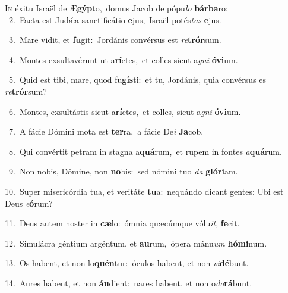 \lettrine{\initial\textcolor{\initialcolor}{I}}{n} éxitu Israël de Æ\-\textbf{gýp}\-to,~\star domus Jacob de pópu\textit{lo} \textbf{bár}\-\textbf{ba}ro:\\
{\numbfont\textcolor{\numbcolor}{~2.}}~Facta est Judǽa sanctificátio \textbf{e}\-jus,~\star Israël potés\textit{tas} \textbf{e}\-jus.\par
{\numbfont\textcolor{\numbcolor}{~3.}}~Mare vidit, et \textbf{fu}\-git:~\star Jordánis convérsus est \textit{re}\-\textbf{trór}sum.\par
{\numbfont\textcolor{\numbcolor}{~4.}}~Montes exsultavérunt ut a\-\textbf{rí}\-etes,~\star et colles sicut a\textit{gni} \textbf{ó}\-\textbf{vi}um.\par
{\numbfont\textcolor{\numbcolor}{~5.}}~Quid est tibi, mare, quod fu\-\textbf{gís}\-ti:~\star et tu, Jordánis, quia convérsus es \textit{re}\-\textbf{trór}sum?\par
{\numbfont\textcolor{\numbcolor}{~6.}}~Montes, exsultástis sicut a\-\textbf{rí}\-etes,~\star et colles, sicut a\textit{gni} \textbf{ó}\-\textbf{vi}um.\par
{\numbfont\textcolor{\numbcolor}{~7.}}~A fácie Dómini mota est \textbf{ter}\-ra,~\star a fácie De\textit{i} \textbf{Ja}\-cob.\par
{\numbfont\textcolor{\numbcolor}{~8.}}~Qui convértit petram in stagna a\-\textbf{quá}\-rum,~\star et rupem in fontes \textit{a}\-\textbf{quá}rum.\par
{\numbfont\textcolor{\numbcolor}{~9.}}~Non nobis, Dómine, non \textbf{no}\-bis:~\star sed nómini tuo \textit{da} \textbf{gló}\-\textbf{ri}am.\par
{\numbfont\textcolor{\numbcolor}{10.}}~Super misericórdia tua, et veritáte \textbf{tu}\-a:~\star nequándo dicant gentes: Ubi est Deus \textit{e}\-\textbf{ó}rum?\par
{\numbfont\textcolor{\numbcolor}{11.}}~Deus autem noster in \textbf{cæ}\-lo:~\star ómnia quæcúmque vólu\-\textit{it}\-, \textbf{fe}\-cit.\par
{\numbfont\textcolor{\numbcolor}{12.}}~Simulácra géntium argéntum, et \textbf{au}\-rum,~\star ópera mánu\textit{um} \textbf{hó}\-\textbf{mi}num.\par
{\numbfont\textcolor{\numbcolor}{13.}}~Os habent, et non lo\-\textbf{quén}\-tur:~\star óculos habent, et non \textit{vi}\-\textbf{dé}bunt.\par
{\numbfont\textcolor{\numbcolor}{14.}}~Aures habent, et non \textbf{áu}\-dient:~\star nares habent, et non o\-\textit{do}\-\textbf{rá}bunt.\par
